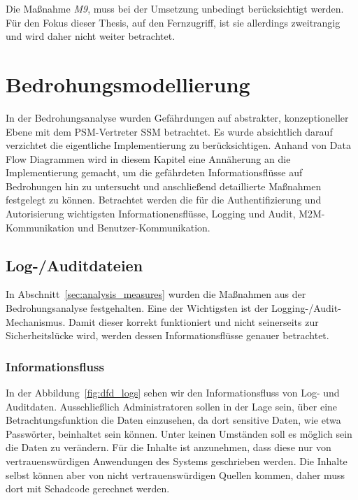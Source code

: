 \documentclass[11pt,a4paper]{report}
\begin{document}
Die Maßnahme \textit{M9}, muss bei der Umsetzung unbedingt berücksichtigt werden. Für den Fokus dieser Thesis, auf den Fernzugriff, ist sie allerdings zweitrangig und wird daher nicht weiter betrachtet.

\chapter{Bedrohungsmodellierung} \label{chap:threat_modelling}

In der Bedrohungsanalyse wurden Gefährdungen auf abstrakter, konzeptioneller Ebene mit dem PSM-Vertreter SSM betrachtet. Es wurde absichtlich darauf verzichtet die eigentliche Implementierung zu berücksichtigen. Anhand von Data Flow Diagrammen wird in diesem Kapitel eine Annäherung an die Implementierung gemacht, um die gefährdeten Informationsflüsse auf Bedrohungen hin zu untersucht und anschließend detaillierte Maßnahmen festgelegt zu können. Betrachtet werden die für die Authentifizierung und Autorisierung wichtigsten Informationensflüsse, Logging und Audit, M2M-Kommunikation und Benutzer-Kommunikation.

\section{Log-/Auditdateien} \label{sec:bmod_logaud} 

In Abschnitt~\ref{sec:analysis_measures} wurden die Maßnahmen aus der Bedrohungsanalyse festgehalten. Eine der Wichtigsten ist der Logging-/Audit-Mechanismus. Damit dieser korrekt funktioniert und nicht seinerseits zur Sicherheitslücke wird, werden dessen Informationsflüsse genauer betrachtet.

\subsection{Informationsfluss}

In der Abbildung~\ref{fig:dfd_logs} sehen wir den Informationsfluss von Log- und Auditdaten. Ausschließlich Administratoren sollen in der Lage sein, über eine  Betrachtungsfunktion die Daten einzusehen, da dort sensitive Daten, wie etwa Passwörter, beinhaltet sein können. Unter keinen Umständen soll es möglich sein die Daten zu verändern. Für die Inhalte ist anzunehmen, dass diese nur von vertrauenswürdigen Anwendungen des Systems geschrieben werden. Die Inhalte selbst können aber von nicht vertrauenswürdigen Quellen kommen, daher muss dort mit Schadcode gerechnet werden.
\end{document}
